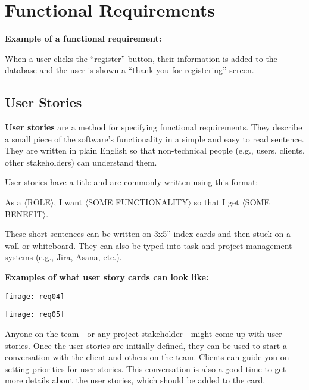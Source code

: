 \section{Functional Requirements}

\marginpar{\functionalRequirementDef}

\spacer
\noindent\textbf{Example of a functional requirement:}
\begin{displayquote}
When a user clicks the ``register'' button, their information is added to the database and the user is shown a ``thank you for registering'' screen.
\end{displayquote}

\subsection{User Stories}

\textbf{User stories} are a method for specifying functional requirements. They describe a small piece of the software's functionality in a simple and easy to read sentence. They are written in plain English so that non-technical people (e.g., users, clients, other stakeholders) can understand them.

\marginpar{\userStoryDef}User stories have a title and are commonly written using this format:
\begin{displayquote}
As a $\langle$ROLE$\rangle$, I want $\langle$SOME FUNCTIONALITY$\rangle$ so that I get $\langle$SOME BENEFIT$\rangle$.
\end{displayquote}

These short sentences can be written on 3x5'' index cards and then stuck on a wall or whiteboard. They can also be typed into task and project management systems (e.g., Jira, Asana, etc.).

\spacer
\noindent\textbf{Examples of what user story cards can look like:}

\texttt{[image: req04]}

\texttt{[image: req05]}

Anyone on the team---or any project stakeholder---might come up with user stories. Once the user stories are initially defined, they can be used to start a conversation with the client and others on the team. Clients can guide you on setting priorities for user stories. This conversation is also a good time to get more details about the user stories, which should be added to the card.

